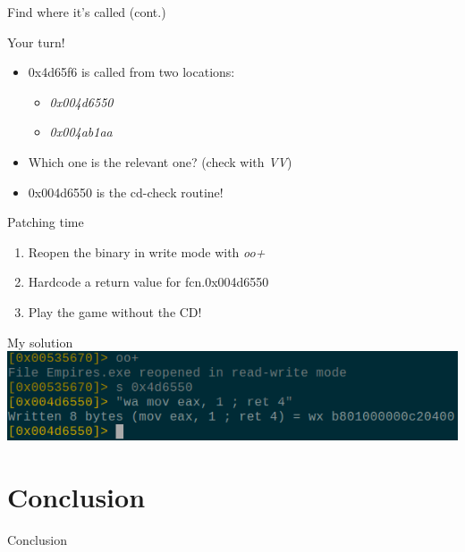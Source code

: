 \documentclass{beamer}
\begin{document}
\begin{frame}{Find where it's called (cont.)}
	\begin{block}{Your turn!}
		\begin{itemize}[<+->]
			\item \alert{0x4d65f6} is called from two locations:
				\begin{itemize}
					\item \emph{0x004d6550}
					\item \emph{0x004ab1aa}
				\end{itemize}
			\item Which one is the relevant one? (check with \emph{VV})
			\item \alert{0x004d6550} is the cd-check routine!
		\end{itemize}
	\end{block}
\end{frame}

\begin{frame}{Patching time}
	\begin{enumerate}
		\item Reopen the binary in \alert{write} mode with \emph{oo+}
		\item Hardcode a return value for \alert{fcn.0x004d6550}
		\item Play the game without the CD!
	\end{enumerate}
\end{frame}

\begin{frame}{My solution}
	\includegraphics[width=\textwidth,height=.3\textheight]{crack.png}
\end{frame}

\section*{Conclusion}
\begin{frame}{Conclusion}
	\begin{center}
	\end{center}
\end{frame}
\end{document}
